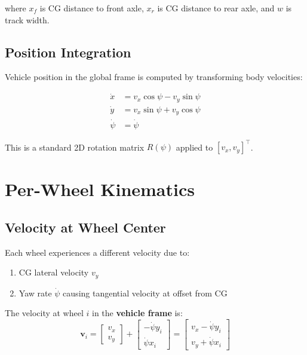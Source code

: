 \documentclass[11pt,a4paper]{article}
\begin{document}
where $x_f$ is CG distance to front axle, $x_r$ is CG distance to rear axle, and $w$ is track width.

\subsection{Position Integration}

Vehicle position in the global frame is computed by transforming body velocities:

\begin{align}
\dot{x} &= v_x \cos\psi - v_y \sin\psi \\
\dot{y} &= v_x \sin\psi + v_y \cos\psi \\
\dot{\psi} &= \dot{\psi}
\end{align}

This is a standard 2D rotation matrix $R(\psi)$ applied to $[v_x, v_y]^\top$.

\section{Per-Wheel Kinematics}

\subsection{Velocity at Wheel Center}

Each wheel experiences a different velocity due to:
\begin{enumerate}
    \item CG lateral velocity $v_y$
    \item Yaw rate $\dot{\psi}$ causing tangential velocity at offset from CG
\end{enumerate}

The velocity at wheel $i$ in the \textbf{vehicle frame} is:
\begin{equation}
\bm{v}_i = \begin{bmatrix} v_x \\ v_y \end{bmatrix} + \begin{bmatrix} -\dot{\psi} y_i \\ \dot{\psi} x_i \end{bmatrix} = \begin{bmatrix} v_x - \dot{\psi} y_i \\ v_y + \dot{\psi} x_i \end{bmatrix}
\end{equation}
\end{document}
